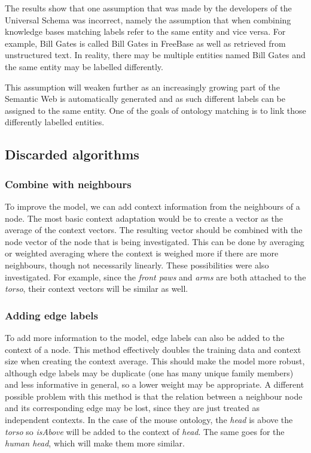 \documentclass{article}
\begin{document}
  The results show that one assumption that was made by the developers of the Universal Schema was incorrect, namely the assumption that when combining knowledge bases matching labels refer to the same entity and vice versa. For example, Bill Gates is called Bill Gates in FreeBase as well as retrieved from unstructured text. In reality, there may be multiple entities named Bill Gates and the same entity may be labelled differently. 
  
  This assumption will weaken further as an increasingly growing part of the Semantic Web is automatically generated and as such different labels can be assigned to the same entity. One of the goals of ontology matching is to link those differently labelled entities.
  
  
 
 \subsection{Discarded algorithms}
  \subsubsection{Combine with neighbours}
  To improve the model, we can add context information from the neighbours of a node. The most basic context adaptation would be to create a vector as the average of the context vectors. The resulting vector should be combined with the node vector of the node that is being investigated. This can be done by averaging or weighted averaging where the context is weighed more if there are more neighbours, though not necessarily linearly. These possibilities were also investigated.
  For example, since the \emph{front paws} and \emph{arms} are both attached to the \emph{torso}, their context vectors will be similar as well.
  
  \subsubsection{Adding edge labels}
  To add more information to the model, edge labels can also be added to the context of a node. This method effectively doubles the training data and context size when creating the context average. This should make the model more robust, although edge labels may be duplicate (one has many unique family members) and less informative in general, so a lower weight may be appropriate. A different possible problem with this method is that the relation between a neighbour node and its corresponding edge may be lost, since they are just treated as independent contexts.
  In the case of the mouse ontology, the \emph{head} is above the \emph{torso} so \emph{isAbove} will be added to the context of \emph{head}. The same goes for the \emph{human head}, which will make them more similar.
\end{document}
